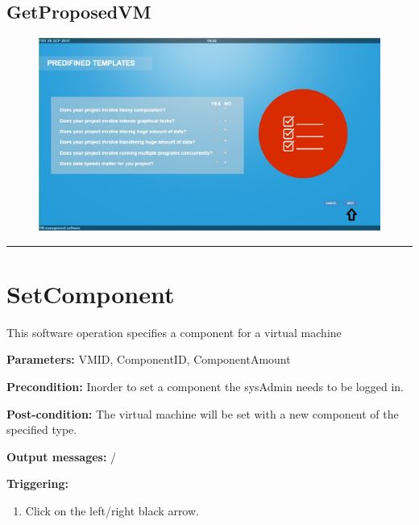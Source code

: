 \subsection{GetProposedVM}

\begin{figure}[H]
\centering
\includegraphics[width=170mm]{images/getproposed.eps}
\caption{\label{overflow}}
\end{figure}


\hrule
\vspace{0.5cm}





















\section{SetComponent}
\label{operation:SetComponent}
This software operation specifies a component for a virtual machine
\begin{description}

\item \textbf{Parameters:} VMID, ComponentID, ComponentAmount
\item \textbf{Precondition:} Inorder to set a component the sysAdmin needs to be
logged in.
\item \textbf{Post-condition:} The virtual machine will be set with a new
component of the specified type.
\item \textbf{Output messages:} /

\item \textbf{Triggering:}
\begin{enumerate}
\item Click on the left/right black arrow.
\end{enumerate}

 
\end{description}
 
